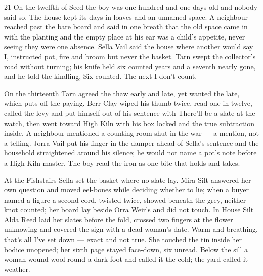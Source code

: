 
\scenebreak


\scenebreak


\scenebreak

\scenebreak

\CRtailpiece
\begin{CRchronicle}{21}
On the twelfth of Seed the boy was one hundred and one days old and nobody said so. The house kept its days in loaves and an unnamed space. A neighbour reached past the bare board and said in one breath that the old space came in with the planting and the empty place at his ear was a child’s appetite, never seeing they were one absence. Sella Vail said the house where another would say I, instructed pot, fire and broom but never the basket. Tarn swept the collector’s road without turning; his knife held six counted years and a seventh nearly gone, and he told the kindling, Six counted. The next I don’t count.

On the thirteenth Tarn agreed the thaw early and late, yet wanted the late, which puts off the paying. Berr Clay wiped his thumb twice, read one in twelve, called the levy and put himself out of his sentence with There’ll be a slate at the watch, then went toward High Kiln with his box locked and the true subtraction inside. A neighbour mentioned a counting room shut in the war — a mention, not a telling. Jorra Vail put his finger in the damper ahead of Sella’s sentence and the household straightened around his silence; he would not name a pot’s note before a High Kiln master. The boy read the iron as one bite that holds and takes.

At the Fishstairs Sella set the basket where no slate lay. Mira Silt answered her own question and moved eel-bones while deciding whether to lie; when a buyer named a figure a second cord, twisted twice, showed beneath the grey, neither knot counted; her board lay beside Orra Weir’s and did not touch. In House Silt Alda Reed laid her slates before the fold, crossed two fingers at the flower unknowing and covered the sign with a dead woman’s date. Warm and breathing, that’s all I’ve set down — exact and not true. She touched the tin inside her bodice unopened; her sixth page stayed face-down, six unread. Below the sill a woman wound wool round a dark foot and called it the cold; the yard called it weather.


\end{CRchronicle}
